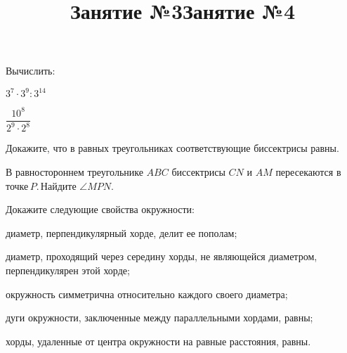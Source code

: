 	\begin{listofex}
		\item Вычислить:
	\begin{enumcols}[itemcolumns=2]
		\item \( 3^7\cdot3^9:3^{14} \)
		\item \( \dfrac{10^8}{2^9\cdot2^8} \)
	\end{enumcols}
	\item {}
	\item {}
	\item Докажите, что в равных треугольниках соответствующие биссектрисы равны.
	\item В равностороннем треугольнике \( ABC \) биссектрисы \( CN \) и \( AM \) пересекаются в точке \( P \). Найдите \( \angle MPN \).
	\item {}
	\item {}
	\item {}
	\item {}
\end{listofex}
\newpage
\title{Занятие №3}
\begin{listofex}
	\item Докажите следующие свойства окружности:
	\begin{enumcols}[itemcolumns=1]
		\item диаметр, перпендикулярный хорде, делит ее пополам;
		\item диаметр, проходящий через середину хорды, не являющейся диаметром, перпендикулярен этой хорде;
		\item окружность симметрична относительно каждого своего
		диаметра;
		\item дуги окружности, заключенные между параллельными
		хордами, равны;
		\item хорды, удаленные от центра окружности на равные расстояния, равны.
	\end{enumcols}
	\item {}
	\item {}
	\item {}
	\item {}
	\item {}
\end{listofex}
\newpage
\title{Занятие №4}
\begin{listofex}
	\item {}
	\item {}
	\item {}
	\item {}
	\item {}
\end{listofex}
